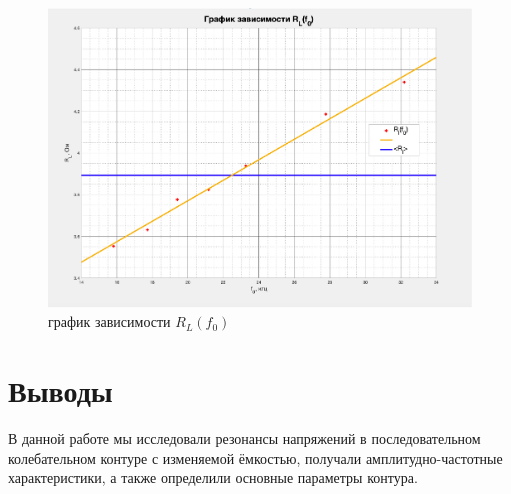 \documentclass[a4paper,14pt]{article}
\begin{document}
\begin{enumerate}
\begin{center}
	\begin{figure}[bhtp!]
		\centering
		\includegraphics[width=0.75\linewidth]{gr4.pdf}
		\caption{график зависимости $R_L(f_0)$}
		\label{gr4}
	\end{figure}
\end{center}


\end{enumerate}

\section*{Выводы}

В данной работе мы исследовали резонансы напряжений в последовательном колебательном контуре с изменяемой ёмкостью, получали амплитудно-частотные характеристики, а также определили основные параметры контура.
\end{document}
